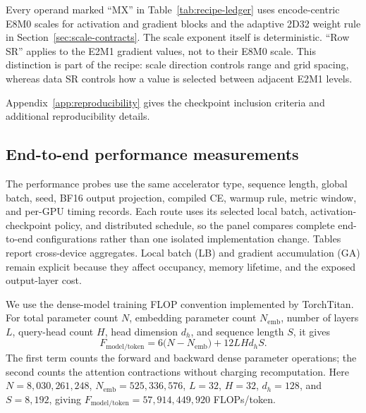 Every operand marked ``MX'' in Table~\ref{tab:recipe-ledger} uses
encode-centric E8M0 scales for activation and gradient blocks and the adaptive
2D32 weight rule in Section~\ref{sec:scale-contracts}. The scale exponent
itself is deterministic. ``Row SR'' applies to the E2M1 gradient values, not
to their E8M0 scale. This distinction is part of the recipe: scale direction
controls range and grid spacing, whereas data SR controls how a value is
selected between adjacent E2M1 levels.

Appendix~\ref{app:reproducibility} gives the checkpoint inclusion criteria and
additional reproducibility details.

\FloatBarrier
\subsection{End-to-end performance measurements}

The performance probes use the same accelerator type, sequence length, global
batch, seed, BF16 output projection, compiled CE, warmup rule, metric window,
and per-GPU timing records. Each route uses its selected local batch,
activation-checkpoint policy, and distributed schedule, so the panel compares
complete end-to-end configurations rather than one isolated implementation
change. Tables report cross-device aggregates. Local batch (LB) and gradient
accumulation (GA) remain explicit because they affect occupancy, memory
lifetime, and the exposed output-layer cost.

We use the dense-model training FLOP convention implemented by TorchTitan. For
total parameter count $N$, embedding parameter count
$N_{\mathrm{emb}}$, number of layers $L$, query-head count $H$, head dimension
$d_h$, and sequence length $S$, it gives
\begin{equation}
  F_{\mathrm{model/token}}
  =6\bigl(N-N_{\mathrm{emb}}\bigr)+12LHd_hS.
  \label{eq:model-flops}
\end{equation}
The first term counts the forward and backward dense parameter operations;
the second counts the attention contractions without charging recomputation.
Here $N=8{,}030{,}261{,}248$, $N_{\mathrm{emb}}=525{,}336{,}576$, $L=32$,
$H=32$, $d_h=128$, and $S=8{,}192$, giving
$F_{\mathrm{model/token}}=57{,}914{,}449{,}920$ FLOPs/token.

